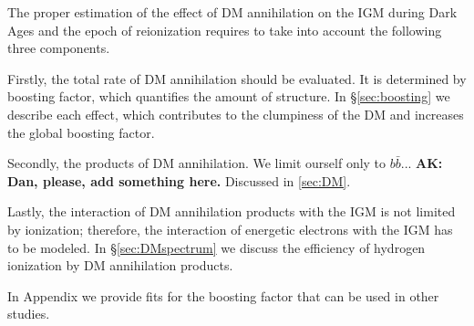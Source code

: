 The proper estimation of the effect of DM annihilation on the IGM during Dark Ages and the epoch of reionization requires to take into account the following three components.

Firstly, the total rate of DM annihilation should be evaluated. It is determined by boosting factor, which quantifies the amount of structure. In \S\ref{sec:boosting} we describe each effect, which contributes to the clumpiness of the DM and increases the global boosting factor.

Secondly, the products of DM annihilation. We limit ourself only to $b\bar{b}$...
\textbf{AK: Dan, please, add something here.} Discussed in \s\ref{sec:DM}.

Lastly, the interaction of DM annihilation products with the IGM is not limited by ionization; therefore, the interaction of energetic electrons with the IGM has to be modeled. In \S\ref{sec:DMspectrum} we discuss the efficiency of hydrogen ionization by DM annihilation products.

In Appendix we provide fits for the boosting factor that can be used in other studies.